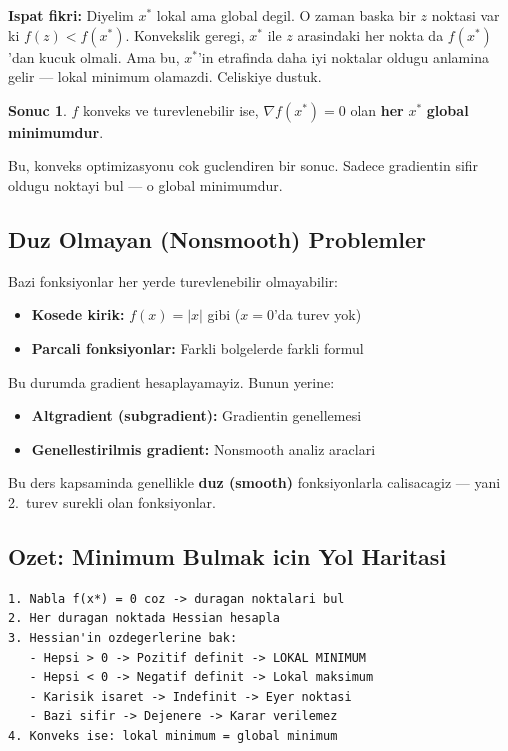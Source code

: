 \documentclass[12pt,a4paper]{article}
\theoremstyle{definition}
\newtheorem{sonuc}[teorem]{Sonuc}
\theoremstyle{remark}
\begin{document}
\textbf{Ispat fikri:} Diyelim $x^*$ lokal ama global degil. O zaman baska bir $z$ noktasi var ki $f(z) < f(x^*)$. Konvekslik geregi, $x^*$ ile $z$ arasindaki her nokta da $f(x^*)$'dan kucuk olmali. Ama bu, $x^*$'in etrafinda daha iyi noktalar oldugu anlamina gelir --- lokal minimum olamazdi. Celiskiye dustuk.

\begin{sonuc}
$f$ konveks ve turevlenebilir ise, $\nabla f(x^*) = 0$ olan \textbf{her} $x^*$ \textbf{global minimumdur}.
\end{sonuc}

Bu, konveks optimizasyonu cok guclendiren bir sonuc. Sadece gradientin sifir oldugu noktayi bul --- o global minimumdur.

\subsection{Duz Olmayan (Nonsmooth) Problemler}

Bazi fonksiyonlar her yerde turevlenebilir olmayabilir:

\begin{itemize}[leftmargin=*, itemsep=0.2em]
\item \textbf{Kosede kirik:} $f(x) = |x|$ gibi ($x = 0$'da turev yok)
\item \textbf{Parcali fonksiyonlar:} Farkli bolgelerde farkli formul
\end{itemize}

Bu durumda gradient hesaplayamayiz. Bunun yerine:
\begin{itemize}[leftmargin=*, itemsep=0.2em]
\item \textbf{Altgradient (subgradient):} Gradientin genellemesi
\item \textbf{Genellestirilmis gradient:} Nonsmooth analiz araclari
\end{itemize}

Bu ders kapsaminda genellikle \textbf{duz (smooth)} fonksiyonlarla calisacagiz --- yani 2.\ turev surekli olan fonksiyonlar.

\subsection{Ozet: Minimum Bulmak icin Yol Haritasi}

\begin{Verbatim}[frame=single, fontsize=\small]
1. Nabla f(x*) = 0 coz -> duragan noktalari bul
2. Her duragan noktada Hessian hesapla
3. Hessian'in ozdegerlerine bak:
   - Hepsi > 0 -> Pozitif definit -> LOKAL MINIMUM
   - Hepsi < 0 -> Negatif definit -> Lokal maksimum
   - Karisik isaret -> Indefinit -> Eyer noktasi
   - Bazi sifir -> Dejenere -> Karar verilemez
4. Konveks ise: lokal minimum = global minimum
\end{Verbatim}
\end{document}
